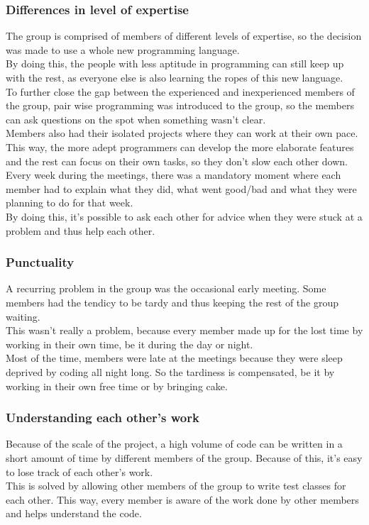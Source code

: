 \documentclass[10pt,a4paper]{report}
\begin{document}
			\subsubsection*{Differences in level of expertise}
				The group is comprised of members of different levels of expertise, so the decision was made to use a whole new programming language.\\ 
				By doing this, the people with less aptitude in programming can still keep up with the rest, as everyone else is also learning the ropes of this new language.\\
				To further close the gap between the experienced and inexperienced members of the group, pair wise programming was introduced to the group, so the members can ask questions on the spot when something wasn't clear.\\
				Members also had their isolated projects where they can work at their own pace. This way, the more adept programmers can develop the more elaborate features and the rest can focus on their own tasks, so they don't slow each other down.\\ 
				Every week during the meetings, there was a mandatory moment where each member had to explain what they did, what went good/bad and what they were planning to do for that week.\\ 
				By doing this, it's possible to ask each other for advice when they were stuck at a problem and thus help each other.
			\subsubsection*{Punctuality}
				A recurring problem in the group was the occasional early meeting. Some members had the tendicy to be tardy and thus keeping the rest of the group waiting. \\
				This wasn't really a problem, because every member made up for the lost time by working in their own time, be it during the day or night. \\
				Most of the time, members were late at the meetings because they were sleep deprived by coding all night long. So the tardiness is compensated, be it by working in their own free time or by bringing cake.
			\subsubsection*{Understanding each other's work}
				Because of the scale of the project, a high volume of code can be written in a short amount of time by 	different members of the group. Because of this, it's easy to lose track of each other's work. \\
				This is solved by allowing other members of the group to write test classes for each other. This way, every member is aware of the work done by other members and helps understand the code.
\end{document}
